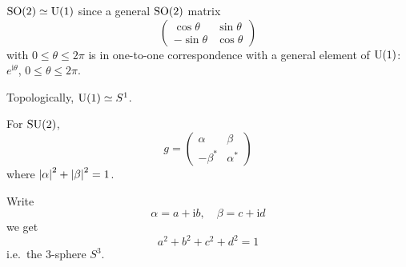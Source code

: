 \documentclass[a4paper,11pt]{article}
\begin{document}
	\begin{ex}
		$\operatorname{SO}(2) \simeq \operatorname{U}(1)$ since a general $\operatorname{SO}(2)$ matrix
		\[
			\begin{pmatrix}
				\cos \theta & \sin \theta\\
				-\sin \theta & \cos \theta
			\end{pmatrix}
		\]
		with $0 \leq \theta \leq 2 \pi$ is in one-to-one correspondence with a general element of $\operatorname{U}(1)$: $e ^{\mathrm{i} \theta}$, $0 \leq \theta \leq 2 \pi$.

		Topologically, $\operatorname{U}(1) \simeq S^1$.

		For $\operatorname{SU}(2)$,
		\[
			g = \begin{pmatrix}
				\alpha & \beta\\
				-\beta^* & \alpha^*
			\end{pmatrix}
		\]
		where $\abs{\alpha}^2 + \abs{\beta}^2 = 1$.

		Write 
		\[
			\alpha = a + \mathrm{i} b, \quad \beta = c + \mathrm{i} d
		\]
		we get
		\[
			a^2 + b^2 + c^2 + d^2 = 1
		\]
		i.e.\ the 3-sphere $S^3$.
	\end{ex}
\end{document}
